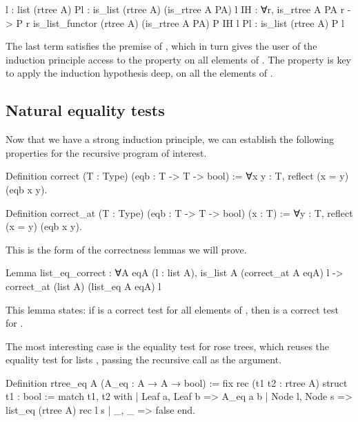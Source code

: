 \documentclass{these-ISSS}
\newenvironment{rocqcode}
  {\VerbatimEnvironment\begin{rocqbox}\begin{xrocqcode}}{\end{xrocqcode}
\end{rocqbox}}
\begin{document}
\begin{rocqcode}
l  : list (rtree A)
Pl : is_list (rtree A) (is_rtree A PA) l
IH : ∀r, is_rtree A PA r -> P r
is_list_functor (rtree A) (is_rtree A PA) P IH l Pl :
  is_list (rtree A) P l
\end{rocqcode}

The last term satisfies the premise of , which in turn gives
the user of the induction principle access to the property  on all
elements of . The  property is
key to apply the induction hypothesis  deep, on all the elements
of . 

\subsection{Natural equality tests}


Now that we have a strong induction principle, we can establish the following
properties for the recursive program of interest.

\begin{rocqcode}
Definition correct (T : Type) (eqb : T -> T -> bool) :=
  ∀x y : T, reflect (x = y) (eqb x y).

Definition correct_at (T : Type) (eqb : T -> T -> bool) (x : T) :=
  ∀y : T, reflect (x = y) (eqb x y).
\end{rocqcode}

\noindent
This is the form of the correctness lemmas we will prove.

\begin{rocqcode}
Lemma list_eq_correct : ∀A eqA (l : list A),
  is_list A (correct_at A eqA) l ->
    correct_at (list A) (list_eq A eqA) l
\end{rocqcode}

\noindent
This lemma states: if  is a correct test for all elements of
, then  is a correct test for .

The most interesting case is the equality test for rose trees, which reuses
the equality test for lists , passing the recursive call as the
 argument.

\begin{rocqcode}
Definition rtree_eq A (A_eq : A → A → bool) :=
  fix rec (t1 t2 : rtree A) {struct t1} : bool :=
    match t1, t2 with
    | Leaf a, Leaf b => A_eq a b
    | Node l, Node s => list_eq (rtree A) rec l s
    | _, _ => false
    end.
\end{rocqcode}
\end{document}
